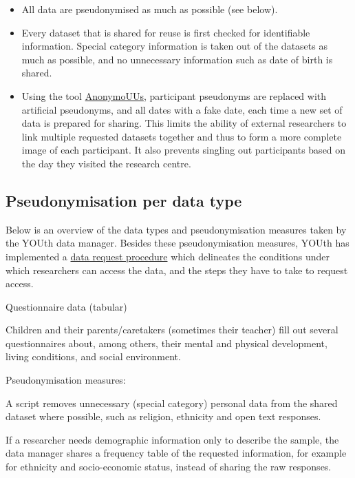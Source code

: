 \documentclass[
]{book}
\providecommand{\tightlist}{%
  \setlength{\itemsep}{0pt}\setlength{\parskip}{0pt}}
\begin{document}
\begin{itemize}
\tightlist
\item
  All data are pseudonymised as much as possible (see below).
\item
  Every dataset that is shared for reuse is first checked for identifiable
  information. Special category information is taken out of the datasets as much
  as possible, and no unnecessary information such as date of birth is shared.
\item
  Using the tool
  \href{https://github.com/UtrechtUniversity/anonymouus}{AnonymoUUs},
  participant pseudonyms are replaced with artificial pseudonyms, and all
  dates with a fake date, each time a new set of data is prepared for sharing.
  This limits the ability of external researchers to link multiple requested
  datasets together and thus to form a more complete image of each participant.
  It also prevents singling out participants based on the day they visited the
  research centre.
\end{itemize}

\hypertarget{pseudonymisation-per-data-type}{%
\subsection{Pseudonymisation per data type}\label{pseudonymisation-per-data-type}}

Below is an overview of the data types and pseudonymisation measures taken by
the YOUth data manager. Besides these pseudonymisation measures, YOUth has
implemented a
\href{https://www.uu.nl/en/research/youth-cohort-study/data-access}{data request procedure}
which delineates the conditions under which researchers can access the data,
and the steps they have to take to request access.

Questionnaire data (tabular)

Children and their parents/caretakers (sometimes their teacher) fill out
several questionnaires about, among others, their mental and physical
development, living conditions, and social environment.

Pseudonymisation measures:

A script removes unnecessary (special category) personal data from the
shared dataset where possible, such as religion, ethnicity and open text
responses.

If a researcher needs demographic information only to describe the sample,
the data manager shares a frequency table of the requested information, for
example for ethnicity and socio-economic status, instead of sharing the raw
responses.
\end{document}
